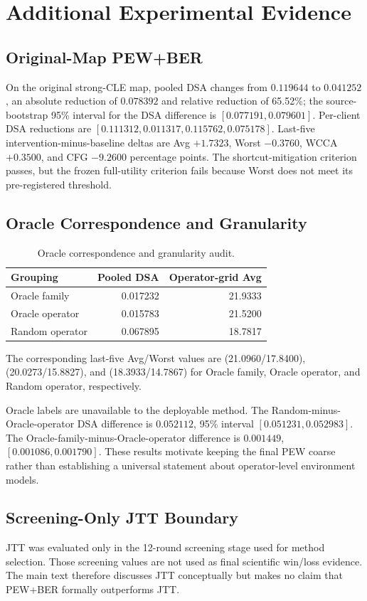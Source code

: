 \documentclass[10pt,twocolumn]{article}
\begin{document}
\section{Additional Experimental Evidence}

\subsection{Original-Map PEW+BER}

On the original strong-CLE map, pooled DSA changes from \(0.119644\) to \(0.041252\), an absolute reduction of \(0.078392\) and relative reduction of 65.52\%; the source-bootstrap 95\% interval for the DSA difference is \([0.077191,0.079601]\). Per-client DSA reductions are \([0.111312,0.011317,0.115762,0.075178]\). Last-five intervention-minus-baseline deltas are Avg \(+1.7323\), Worst \(-0.3760\), WCCA \(+0.3500\), and CFG \(-9.2600\) percentage points. The shortcut-mitigation criterion passes, but the frozen full-utility criterion fails because Worst does not meet its pre-registered threshold.

\subsection{Oracle Correspondence and Granularity}

\begin{table}[!ht]
\centering
\small
\caption{Oracle correspondence and granularity audit.}
\label{tab:oracle-granularity}
\begin{tabular}{lrr}
\toprule
Grouping & Pooled DSA & Operator-grid Avg \\
\midrule
Oracle family & 0.017232 & 21.9333 \\
Oracle operator & 0.015783 & 21.5200 \\
Random operator & 0.067895 & 18.7817 \\
\bottomrule
\end{tabular}
\end{table}

The corresponding last-five Avg/Worst values are (21.0960/17.8400),
(20.0273/15.8827), and (18.3933/14.7867) for Oracle family, Oracle
operator, and Random operator, respectively.

Oracle labels are unavailable to the deployable method. The Random-minus-Oracle-operator DSA difference is \(0.052112\), 95\% interval \([0.051231,0.052983]\). The Oracle-family-minus-Oracle-operator difference is \(0.001449\), \([0.001086,0.001790]\). These results motivate keeping the final PEW coarse rather than establishing a universal statement about operator-level environment models.

\subsection{Screening-Only JTT Boundary}

JTT was evaluated only in the 12-round screening stage used for method selection. Those screening values are not used as final scientific win/loss evidence. The main text therefore discusses JTT conceptually \citep{liu2021jtt} but makes no claim that PEW+BER formally outperforms JTT.



\end{document}
